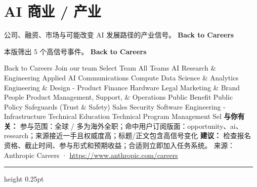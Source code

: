 \documentclass[10.5pt]{ctexart}
\begin{document}
\section*{AI 商业 / 产业}
{\color{ormuted} 公司、融资、市场与可能改变 AI 发展路径的产业信号。}
\vspace{2mm}
{\LARGE\bfseries Back to Careers}\par
\vspace{1mm}
{\color{ormuted} 本版筛出 5 个高信号事件。}
\vspace{3mm}
{\Large\bfseries Back to Careers}\par
Back to Careers Join our team Select Team All Teams AI Research \& Engineering Applied AI Communications Compute Data Science \& Analytics Engineering \& Design - Product Finance Hardware Legal Marketing \& Brand People Product Management, Support, \& Operations Public Benefit Public Policy Safeguards (Trust \& Safety) Sales Security Software Engineering - Infrastructure Technical Education Technical Program Management Sel
\textbf{与你有关：} 参与范围：全球 / 多为海外全职；命中用户订阅版面：opportunity、ai、research；来源接近一手且权威度高；标题/正文包含高信号变化
\textbf{建议：} 检查报名资格、截止时间、参与形式和预期收益；合适则立即加入任务系统。
{\footnotesize\color{ormuted} 来源：Anthropic Careers · \url{https://www.anthropic.com/careers}}
\vspace{4mm}
\hrule height 0.25pt
\vspace{3mm}
\end{document}
